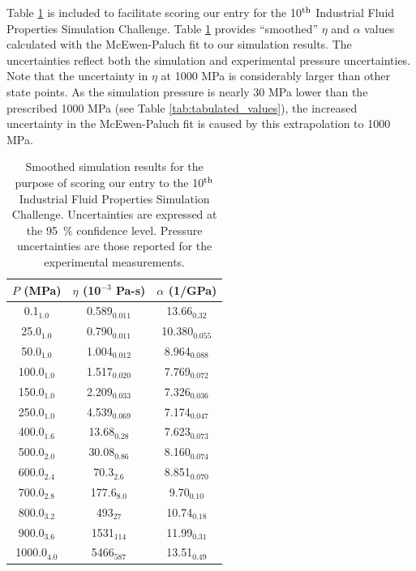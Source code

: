 \documentclass[preprint,review,12pt]{elsarticle}
\begin{document}
	Table \ref{tab:smoothed_values} is included to facilitate scoring our entry for the 10$^{\rm th}$ Industrial Fluid Properties Simulation Challenge. Table \ref{tab:smoothed_values} provides ``smoothed'' $\eta$ and $\alpha$ values calculated with the McEwen-Paluch fit to our simulation results. The uncertainties reflect both the simulation and experimental pressure uncertainties. Note that the uncertainty in $\eta$ at 1000 MPa is considerably larger than other state points. As the simulation pressure is nearly 30 MPa lower than the prescribed 1000 MPa (see Table \ref{tab:tabulated_values}), the increased uncertainty in the McEwen-Paluch fit is caused by this extrapolation to 1000 MPa.
	
	\begin{table}[htb!]
		\caption{Smoothed simulation results for the purpose of scoring our entry to the 10$^{\rm th}$ Industrial Fluid Properties Simulation Challenge. Uncertainties are expressed at the 95~\% confidence level. Pressure uncertainties are those reported for the experimental measurements.} \label{tab:smoothed_values}
		\begin{center}
			\begin{tabular}{|c|c|c|}
				\hline
				$P$ (MPa) & 	$\eta$ (10$^{-3}$ Pa-s) & 	$\alpha$ (1/GPa) \\ \hline
				0.1$_{1.0}$ & 	0.589$_{0.011}$ & 	13.66$_{0.32}$ \\
				25.0$_{1.0}$ & 	0.790$_{0.011}$ & 	10.380$_{0.055}$ \\
				50.0$_{1.0}$ & 	1.004$_{0.012}$ & 	8.964$_{0.088}$ \\
				100.0$_{1.0}$ & 	1.517$_{0.020}$ & 	7.769$_{0.072}$ \\
				150.0$_{1.0}$ & 	2.209$_{0.033}$ & 	7.326$_{0.036}$ \\
				250.0$_{1.0}$ & 	4.539$_{0.069}$ & 	7.174$_{0.047}$ \\
				400.0$_{1.6}$ & 	13.68$_{0.28}$ & 	7.623$_{0.073}$ \\
				500.0$_{2.0}$ & 	30.08$_{0.86}$ & 	8.160$_{0.074}$ \\
				600.0$_{2.4}$ & 	70.3$_{2.6}$ & 	8.851$_{0.070}$ \\
				700.0$_{2.8}$ & 	177.6$_{8.0}$ & 	9.70$_{0.10}$ \\
				800.0$_{3.2}$ & 	493$_{27}$ & 	10.74$_{0.18}$ \\
				900.0$_{3.6}$ & 	1531$_{114}$ & 	11.99$_{0.31}$ \\
				1000.0$_{4.0}$ & 	5466$_{587}$ & 	13.51$_{0.49}$ \\
				\hline
			\end{tabular}
		\end{center} 
	\end{table} 
	
\end{document}
